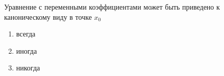 Уравнение с переменными коэффициентами может быть приведено к каноническому виду в точке \(x_0\)

\begin{enumerate}[label=\arabic*)]
    \item всегда
    \item иногда
    \item никогда
\end{enumerate}

